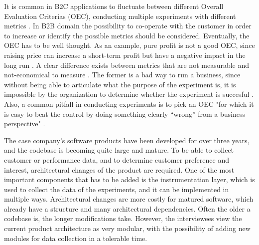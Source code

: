 \documentclass[english, grading]{tktltiki2}
\theoremstyle{definition}
\theoremstyle{remark}
\begin{document}
It is common in B2C applications to fluctuate between different Overall Evaluation Criterias (OEC), conducting multiple experiments with different metrics \cite{kohavi2007practical}. In B2B domain the possibility to co-operate with the customer in order to increase or identify the possible metrics should be considered. Eventually, the OEC has to be well thought. As an example, pure profit is not a good OEC, since raising price can increase a short-term profit but have a negative impact in the long run \cite{kohavi2013online}. A clear difference exists between metrics that are not measurable and not-economical to measure \cite{kohavi2013online}. The former is a bad way to run a business, since without being able to articulate what the purpose of the experiment is, it is impossible by the organization to determine whether the experiment is succesful \cite{kohavi2013online}. Also, a common pitfall in conducting experiments is to pick an OEC "for which it is easy to beat the control by doing something clearly “wrong” from a business perspective" \cite{crook2009seven}.

The case company's software products have been developed for over three years, and the codebase is becoming quite large and mature. To be able to collect customer or performance data, and to determine customer preference and interest, architectural changes of the product are required. One of the most important components that has to be added is the instrumentation layer, which is used to collect the data of the experiments, and it can be implemented in multiple ways. Architectural changes are more costly for matured software, which already have a structure and many architectural dependencies. Often the older a codebase is, the longer modifications take. However, the interviewees view the current product architecture as very modular, with the possibility of adding new modules for data collection in a tolerable time. 

\end{document}
